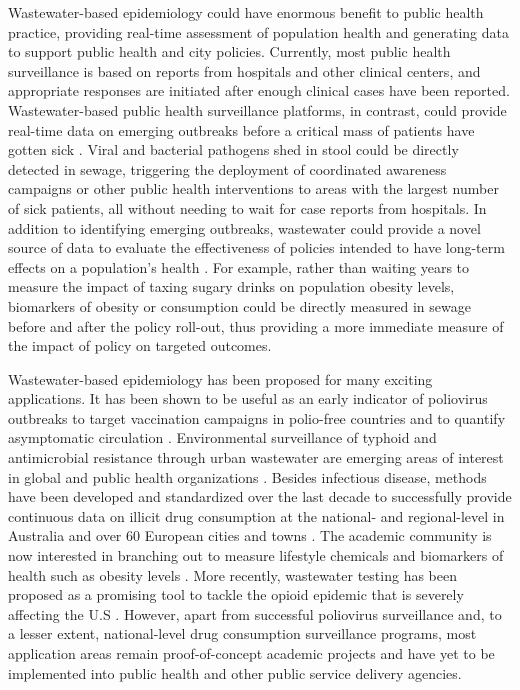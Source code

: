 Wastewater-based epidemiology could have enormous benefit to public health practice, providing real-time assessment of population health and generating data to support public health and city policies. Currently, most public health surveillance is based on reports from hospitals and other clinical centers, and appropriate responses are initiated after enough clinical cases have been reported. Wastewater-based public health surveillance platforms, in contrast, could provide real-time data on emerging outbreaks before a critical mass of patients have gotten sick \cite{Manor2014,Hellmer2014}. Viral and bacterial pathogens shed in stool could be directly detected in sewage, triggering the deployment of coordinated awareness campaigns or other public health interventions to areas with the largest number of sick patients, all without needing to wait for case reports from hospitals. In addition to identifying emerging outbreaks, wastewater could provide a novel source of data to evaluate the effectiveness of policies intended to have long-term effects on a population's health \cite{Daughton2018}. For example, rather than waiting years to measure the impact of taxing sugary drinks on population obesity levels, biomarkers of obesity or consumption could be directly measured in sewage before and after the policy roll-out, thus providing a more immediate measure of the impact of policy on targeted outcomes.

Wastewater-based epidemiology has been proposed for many exciting applications. It has been shown to be useful as an early indicator of poliovirus outbreaks to target vaccination campaigns in polio-free countries \cite{Manor2014,Kaliner2015} and to quantify asymptomatic circulation \cite{Berchenko2017}. Environmental surveillance of typhoid and antimicrobial resistance through urban wastewater are emerging areas of interest in global and public health organizations \cite{Pehrsson2016,Initiatives2018}. Besides infectious disease, methods have been developed and standardized over the last decade to successfully provide continuous data on illicit drug consumption at the national- and regional-level in Australia \cite{AustralianReport} and over 60 European cities and towns \cite{vanNuijs2018,Thomas2012,BazLomba2016}. The academic community is now interested in branching out to measure lifestyle chemicals and biomarkers of health such as obesity levels \cite{Daughton2018,Arnaud2018,Newton2015}. More recently, wastewater testing has been proposed as a promising tool to tackle the opioid epidemic that is severely affecting the U.S \cite{Keshaviah2016,Keshaviah2017}. However, apart from successful poliovirus surveillance and, to a lesser extent, national-level drug consumption surveillance programs, most application areas remain proof-of-concept academic projects and have yet to be implemented into public health and other public service delivery agencies.

